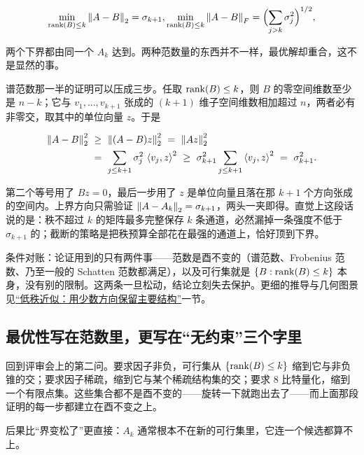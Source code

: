 \[
\min_{\operatorname{rank}(B)\le k}\left\lVert A-B\right\rVert_2 = \sigma_{k+1},
\space
\min_{\operatorname{rank}(B)\le k}\left\lVert A-B\right\rVert_F = \Bigl(\sum_{j>k}\sigma_j^2\Bigr)^{1/2},
\]

两个下界都由同一个 \(A_k\) 达到。两种范数量的东西并不一样，最优解却重合，这不是显然的事。

谱范数那一半的证明可以压成三步。任取 \(\operatorname{rank}(B)\le k\)，则 \(B\) 的零空间维数至少是 \(n-k\)；它与 \(v_1,\dots,v_{k+1}\) 张成的 \((k+1)\) 维子空间维数相加超过 \(n\)，两者必有非零交，取其中的单位向量 \(z\)。于是

\[
\begin{aligned}
\left\lVert A-B\right\rVert_2^2
&\ \ge\ \left\lVert(A-B)z\right\rVert_2^2 \ =\ \left\lVert Az\right\rVert_2^2\\
&\ =\ \sum_{j\le k+1}\sigma_j^2\,\left\langle v_j,z\right\rangle^2
\ \ge\ \sigma_{k+1}^2\sum_{j\le k+1}\left\langle v_j,z\right\rangle^2
\ =\ \sigma_{k+1}^2 .
\end{aligned}
\]

第二个等号用了 \(Bz=0\)，最后一步用了 \(z\) 是单位向量且落在那 \(k+1\) 个方向张成的空间内。上界方向只需验证 \(\left\lVert A-A_k\right\rVert_2=\sigma_{k+1}\)，两头一夹即得。直觉上这段话说的是：秩不超过 \(k\) 的矩阵最多完整保存 \(k\) 条通道，必然漏掉一条强度不低于 \(\sigma_{k+1}\) 的；截断的策略是把秩预算全部花在最强的通道上，恰好顶到下界。

条件对账：论证用到的只有两件事——范数是酉不变的（谱范数、Frobenius 范数、乃至一般的 Schatten 范数都满足），以及可行集就是 \(\left\{B:\operatorname{rank}(B)\le k\right\}\) 本身，没有别的限制。这两条一旦松动，结论立刻失去保护。更细的推导与几何图景见\hyperref[sec:03-Linear-Algebra/07-SVD-and-Data-Applications/03]{``低秩近似：用少数方向保留主要结构''}一节。

\subsection{最优性写在范数里，更写在``无约束''三个字里}

回到评审会上的第二问。要求因子非负，可行集从 \(\left\{\operatorname{rank}(B)\le k\right\}\) 缩到它与非负锥的交；要求因子稀疏，缩到它与某个稀疏结构集的交；要求 8 比特量化，缩到一个有限点集。这些集合都不是酉不变的——旋转一下就跑出去了——而上面那段证明的每一步都建立在酉不变之上。

后果比``界变松了''更直接：\(A_k\) 通常根本不在新的可行集里，它连一个候选都算不上。

